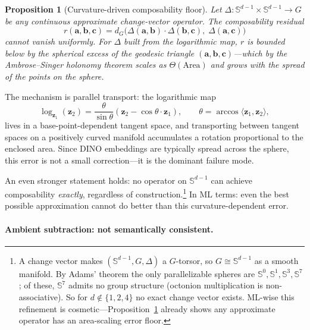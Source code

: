 \documentclass{article}
\newtheorem{proposition}{Proposition}
\newcommand{\vect}[1]{\mathbf{#1}}
\newcommand{\Sph}{\mathbb{S}}
\begin{document}
\begin{proposition}[Curvature-driven composability floor]
\label{prop:composability_floor}
Let $\Delta : \Sph^{d-1} \times \Sph^{d-1} \to G$ be any continuous approximate change-vector operator. The composability residual
\[
    r(\vect{a}, \vect{b}, \vect{c}) = d_G\!\bigl(\Delta(\vect{a}, \vect{b}) \cdot \Delta(\vect{b}, \vect{c}),\; \Delta(\vect{a}, \vect{c})\bigr)
\]
cannot vanish uniformly. For $\Delta$ built from the logarithmic map, $r$ is bounded below by the spherical excess of the geodesic triangle $(\vect{a}, \vect{b}, \vect{c})$---which by the Ambrose--Singer holonomy theorem \citep{ambrose1953theorem} scales as $\Theta(\mathrm{Area})$ and grows with the spread of the points on the sphere.
\end{proposition}

\noindent The mechanism is parallel transport: the logarithmic map
\begin{equation}
    \log_{\vect{z}_1}(\vect{z}_2) = \frac{\theta}{\sin\theta}\left(\vect{z}_2 - \cos\theta \cdot \vect{z}_1\right), \qquad \theta = \arccos\langle \vect{z}_1, \vect{z}_2 \rangle,
\end{equation}
lives in a base-point-dependent tangent space, and transporting between tangent spaces on a positively curved manifold accumulates a rotation proportional to the enclosed area. Since DINO embeddings are typically spread across the sphere, this error is not a small correction---it is the dominant failure mode.

An even stronger statement holds: no operator on $\Sph^{d-1}$ can achieve composability \emph{exactly}, regardless of construction.\footnote{A change vector makes $(\Sph^{d-1}, G, \Delta)$ a $G$-torsor, so $G \cong \Sph^{d-1}$ as a smooth manifold. By Adams' theorem the only parallelizable spheres are $\Sph^0, \Sph^1, \Sph^3, \Sph^7$; of these, $\Sph^7$ admits no group structure (octonion multiplication is non-associative). So for $d \notin \{1, 2, 4\}$ no exact change vector exists. ML-wise this refinement is cosmetic---Proposition~\ref{prop:composability_floor} already shows any approximate operator has an area-scaling error floor.} In ML terms: even the best possible approximation cannot do better than this curvature-dependent error.

\paragraph{Ambient subtraction: not semantically consistent.}
\end{document}
